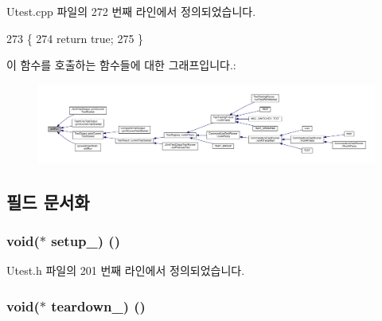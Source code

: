 Utest.\+cpp 파일의 272 번째 라인에서 정의되었습니다.


\begin{DoxyCode}
273 \{
274     \textcolor{keywordflow}{return} \textcolor{keyword}{true};
275 \}
\end{DoxyCode}


이 함수를 호출하는 함수들에 대한 그래프입니다.\+:
\nopagebreak
\begin{figure}[H]
\begin{center}
\leavevmode
\includegraphics[width=350pt]{class_utest_shell_afa35d9bf0fd1c772b04f48d89d318a70_icgraph}
\end{center}
\end{figure}




\subsection{필드 문서화}
\subsubsection[{\texorpdfstring{setup\+\_\+}{setup_}}]{\setlength{\rightskip}{0pt plus 5cm}void($\ast$ setup\+\_\+) ()}\hypertarget{class_exec_function_test_shell_a3ad99c05e46ab50207dc271667f92ae2}{}\label{class_exec_function_test_shell_a3ad99c05e46ab50207dc271667f92ae2}


Utest.\+h 파일의 201 번째 라인에서 정의되었습니다.

\subsubsection[{\texorpdfstring{teardown\+\_\+}{teardown_}}]{\setlength{\rightskip}{0pt plus 5cm}void($\ast$ teardown\+\_\+) ()}\hypertarget{class_exec_function_test_shell_a51e477770ddd81e11c488a3301db1272}{}\label{class_exec_function_test_shell_a51e477770ddd81e11c488a3301db1272}


